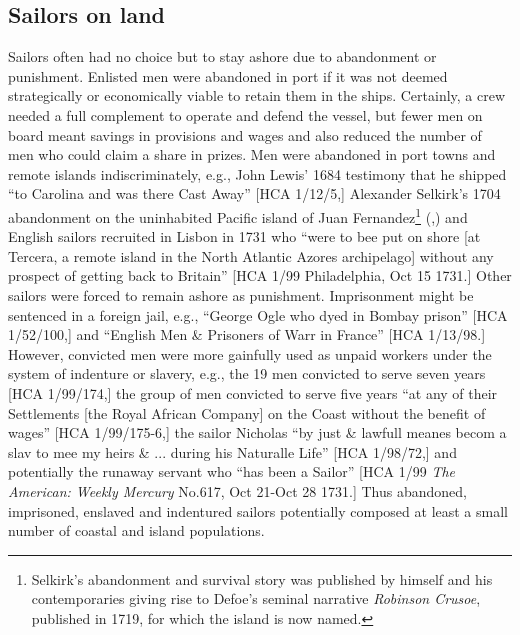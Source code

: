 \subsection{{Sailors} {on} {land}}%

Sailors often had no choice but to stay ashore due to abandonment or punishment. Enlisted men were abandoned in port if it was not deemed strategically or economically viable to retain them in the ships. Certainly, a crew needed a full complement to operate and defend the vessel, but fewer men on board meant savings in provisions and wages and also reduced the number of men who could claim a share in prizes. Men were abandoned in port towns and remote islands indiscriminately, e.g., John Lewis’ 1684 testimony that he shipped “to Carolina and was there Cast Away” [HCA 1/12/5,] Alexander Selkirk’s 1704 abandonment on the uninhabited Pacific island of Juan Fernandez\footnote{Selkirk’s abandonment and survival story was published by himself and his contemporaries giving rise to Defoe’s seminal narrative \textit{Robinson Crusoe}, published in 1719, for which the island is now named.}  (\citealt{Souhami2013},) and English sailors recruited in Lisbon in 1731 who “were to bee put on shore [at Tercera, a remote island in the North Atlantic Azores archipelago] without any prospect of getting back to Britain” [HCA 1/99 Philadelphia, Oct 15 1731.] Other sailors were forced to remain ashore as punishment. Imprisonment might be sentenced in a foreign jail, e.g., “George Ogle who dyed in Bombay prison” [HCA 1/52/100,] and “English Men \& Prisoners of Warr in France” [HCA 1/13/98.] However, convicted men were more gainfully used as unpaid workers under the system of indenture or slavery, e.g., the 19 men convicted to serve seven years [HCA 1/99/174,] the group of men convicted to serve five years “at any of their Settlements [the Royal African Company] on the Coast without the benefit of wages” [HCA 1/99/175-6,] the sailor Nicholas “by just \& lawfull meanes becom a slav to mee my heirs \& ... during his Naturalle Life” [HCA 1/98/72,] and potentially the runaway servant who “has been a Sailor” [HCA 1/99 \textit{The American: Weekly Mercury} No.617, Oct 21-Oct 28 1731.] Thus abandoned, imprisoned, enslaved and indentured sailors potentially composed at least a small number of coastal and island populations. 

